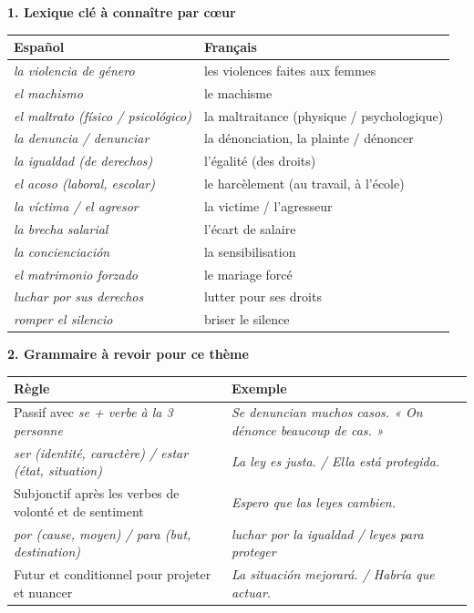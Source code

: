 \documentclass[11pt]{article}
\newcommand{\esp}[1]{\ifmmode\text{\textit{#1}}\else\begingroup\selectlanguage{spanish}\itshape #1\endgroup\fi}
\begin{document}
\begin{bilan}
\textbf{1. Lexique clé à connaître par cœur}
\begin{center}
\begin{tabularx}{\linewidth}{|X|X|}\hline
\rowcolor{popblueL} \textbf{Español} & \textbf{Français} \\ \hline
\esp{la violencia de género} & les violences faites aux femmes \\ \hline
\esp{el machismo} & le machisme \\ \hline
\esp{el maltrato (físico / psicológico)} & la maltraitance (physique / psychologique) \\ \hline
\esp{la denuncia / denunciar} & la dénonciation, la plainte / dénoncer \\ \hline
\esp{la igualdad (de derechos)} & l'égalité (des droits) \\ \hline
\esp{el acoso (laboral, escolar)} & le harcèlement (au travail, à l'école) \\ \hline
\esp{la víctima / el agresor} & la victime / l'agresseur \\ \hline
\esp{la brecha salarial} & l'écart de salaire \\ \hline
\esp{la concienciación} & la sensibilisation \\ \hline
\esp{el matrimonio forzado} & le mariage forcé \\ \hline
\esp{luchar por sus derechos} & lutter pour ses droits \\ \hline
\esp{romper el silencio} & briser le silence \\ \hline
\end{tabularx}
\end{center}

\textbf{2. Grammaire à revoir pour ce thème}
\begin{center}
\begin{tabularx}{\linewidth}{|X|X|}\hline
\rowcolor{popblueL} \textbf{Règle} & \textbf{Exemple} \\ \hline
Passif avec \esp{se} + verbe à la 3\ieme{} personne & \esp{Se denuncian muchos casos.} « On dénonce beaucoup de cas. » \\ \hline
\esp{ser} (identité, caractère) / \esp{estar} (état, situation) & \esp{La ley es justa.} / \esp{Ella está protegida.} \\ \hline
Subjonctif après les verbes de volonté et de sentiment & \esp{Espero que las leyes cambien.} \\ \hline
\esp{por} (cause, moyen) / \esp{para} (but, destination) & \esp{luchar por la igualdad} / \esp{leyes para proteger} \\ \hline
Futur et conditionnel pour projeter et nuancer & \esp{La situación mejorará.} / \esp{Habría que actuar.} \\ \hline
\end{tabularx}
\end{center}


\end{bilan}
\end{document}
